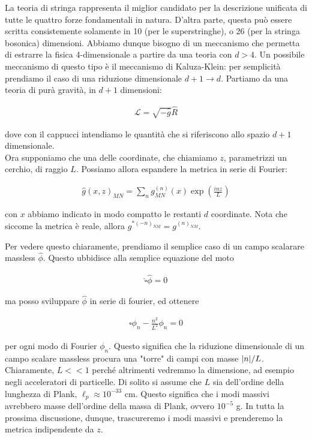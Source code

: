 \documentclass{report}
\begin{document}
La teoria di stringa rappresenta il miglior candidato per la descrizione unificata di tutte le quattro forze fondamentali in natura. D'altra parte, questa può essere scritta consistemente solamente in 10 (per le superstringhe), o 26 (per la stringa bosonica) dimensioni. Abbiamo dunque bisogno di un meccanismo che permetta di estrarre la fisica 4-dimensionale a partire da una teoria con \(d > 4\). Un possibile meccanismo di questo tipo è il meccanismo di Kaluza-Klein: per semplicità prendiamo il caso di una riduzione dimensionale \(d+1 \rightarrow d\). Partiamo da una teoria di purà gravità, in \(d+1\) dimensioni: 

\begin{align}
    \mathcal{L} = \sqrt{-\hat{g}}\hat{R}
\end{align}

dove con il cappucci intendiamo le quantità che si riferiscono allo spazio \(d+1\) dimensionale. \\

Ora supponiamo che una delle coordinate, che chiamiamo \(z\), parametrizzi un cerchio, di raggio \(L\). Possiamo allora espandere la metrica in serie di Fourier: 

\begin{align}
    \hat{g}(x, z)_{MN} = \sum_n g^{(n)}_{MN}(x)\exp{\left(\frac{inz}{L}\right)}
\end{align}

con \(x\) abbiamo indicato in modo compatto le restanti \(d\) coordinate. Nota che siccome la metrica è reale, allora \(g^{* (-n)_{NM}} = g^{(n)_{NM}}\). 


Per vedere questo chiaramente, prendiamo il semplice caso di un campo scalarare massless \(\hat{\phi}\). Questo ubbidisce alla semplice equazione del moto 

\begin{align}
    \hat{\square}\hat{\phi} = 0 
\end{align}

ma posso sviluppare \(\hat{\phi}\) in serie di fourier, ed ottenere 

\begin{align}
    \square\phi_n -\frac{n^2}{L^2}\phi_n = 0
\end{align}

per ogni modo di Fourier \(\phi_n\). Questo significa che la riduzione dimensionale di un campo scalare massless procura una "torre" di campi con masse \(\lvert n\rvert/L\). Chiaramente, \(L <<1\) perché altrimenti vedremmo la dimensione, ad esempio negli acceleratori di particelle. Di solito si assume che \(L\) sia dell'ordine della lunghezza di Plank, \(\ell_p \approx 10^{-33}\) cm. Questo significa che i modi massivi avrebbero masse dell'ordine della massa di Plank, ovvero \(10^{-5}\) g. In tutta la prossima discussione, dunque, trascureremo i modi massivi e prenderemo la metrica indipendente da \(z\). 
\end{document}
